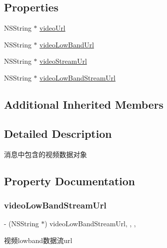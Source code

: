 \subsection*{Properties}
\begin{DoxyCompactItemize}
\item 
N\+S\+String $\ast$ \mbox{\hyperlink{interface_w_b_video_object_a30184590a410ae74ac64a31d156e1c66}{video\+Url}}
\item 
N\+S\+String $\ast$ \mbox{\hyperlink{interface_w_b_video_object_a931e254c3abc980ec91cc17591ac8b4c}{video\+Low\+Band\+Url}}
\item 
N\+S\+String $\ast$ \mbox{\hyperlink{interface_w_b_video_object_a7de33ecf1ce49fa87c4bd98bead6a792}{video\+Stream\+Url}}
\item 
N\+S\+String $\ast$ \mbox{\hyperlink{interface_w_b_video_object_a5163bbd14e3a019900d203cd9ab04416}{video\+Low\+Band\+Stream\+Url}}
\end{DoxyCompactItemize}
\subsection*{Additional Inherited Members}


\subsection{Detailed Description}
消息中包含的视频数据对象 

\subsection{Property Documentation}
\mbox{\label{interface_w_b_video_object_a5163bbd14e3a019900d203cd9ab04416}} 
\subsubsection{\texorpdfstring{video\+Low\+Band\+Stream\+Url}{videoLowBandStreamUrl}}
{\footnotesize\ttfamily -\/ (N\+S\+String $\ast$) video\+Low\+Band\+Stream\+Url\hspace{0.3cm}{\ttfamily [read]}, {\ttfamily [write]}, {\ttfamily [nonatomic]}, {\ttfamily [strong]}}

视频lowband数据流url


